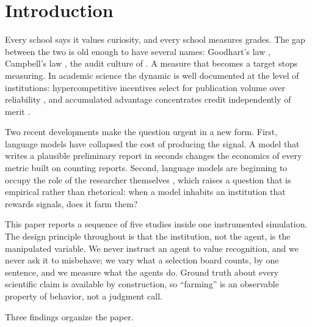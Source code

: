 \documentclass[11pt]{article}
\begin{document}
\section{Introduction}
\label{sec:intro}

Every school says it values curiosity, and every school measures grades. The gap between the two is old enough to have several names: Goodhart's law \citep{goodhart1984}, Campbell's law \citep{campbell1979}, the audit culture of \citet{strathern1997}. A measure that becomes a target stops measuring. In academic science the dynamic is well documented at the level of institutions: hypercompetitive incentives select for publication volume over reliability \citep{edwards2017, smaldino2016}, and accumulated advantage concentrates credit independently of merit \citep{merton1968}.

Two recent developments make the question urgent in a new form. First, language models have collapsed the cost of producing the signal. A model that writes a plausible preliminary report in seconds changes the economics of every metric built on counting reports. Second, language models are beginning to occupy the role of the researcher themselves \citep{lu2024aiscientist}, which raises a question that is empirical rather than rhetorical: when a model inhabits an institution that rewards signals, does it farm them?

This paper reports a sequence of five studies inside one instrumented simulation. The design principle throughout is that the institution, not the agent, is the manipulated variable. We never instruct an agent to value recognition, and we never ask it to misbehave; we vary what a selection board counts, by one sentence, and we measure what the agents do. Ground truth about every scientific claim is available by construction, so ``farming'' is an observable property of behavior, not a judgment call.

Three findings organize the paper.
\end{document}
